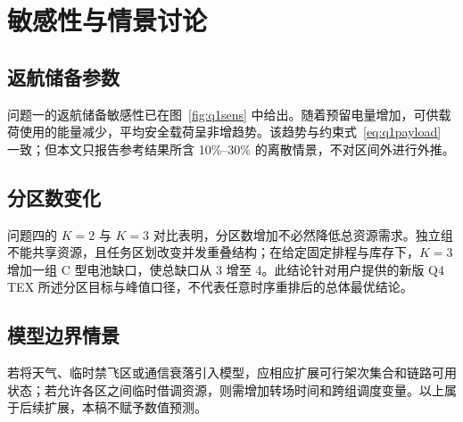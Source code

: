 \section{敏感性与情景讨论}
\subsection{返航储备参数}
问题一的返航储备敏感性已在图~\ref{fig:q1sens} 中给出。随着预留电量增加，可供载荷使用的能量减少，平均安全载荷呈非增趋势。该趋势与约束式~\eqref{eq:q1payload} 一致；但本文只报告参考结果所含 10\%--30\% 的离散情景，不对区间外进行外推。

\subsection{分区数变化}
问题四的 $K=2$ 与 $K=3$ 对比表明，分区数增加不必然降低总资源需求。独立组不能共享资源，且任务区划改变并发重叠结构；在给定固定排程与库存下，$K=3$ 增加一组 C 型电池缺口，使总缺口从 3 增至 4。此结论针对用户提供的新版 Q4 TEX 所述分区目标与峰值口径，不代表任意时序重排后的总体最优结论。

\subsection{模型边界情景}
若将天气、临时禁飞区或通信衰落引入模型，应相应扩展可行架次集合和链路可用状态；若允许各区之间临时借调资源，则需增加转场时间和跨组调度变量。以上属于后续扩展，本稿不赋予数值预测。

